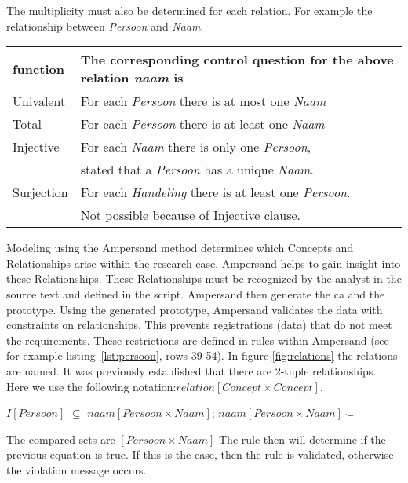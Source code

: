 The multiplicity must also be determined for each relation.
For example the relationship between \textit{Persoon} and \textit{Naam}.
\begin{table}[h!]
    \begin{tabular}{||l | l||} 
     \hline
    function & The corresponding control question for the above relation \textit{naam} is\\
    \hline\hline
        Univalent & For each \textit{Persoon} there is at most one \textit{Naam}\\ %
        Total & For each \textit{Persoon} there is at least one \textit{Naam} \\ %
        Injective & For each \textit{Naam} there is only one \textit{Persoon}, \\&stated that a \textit{Persoon} has a unique \textit{Naam}.\\ %
        Surjection & For each \textit{Handeling} there is at least one \textit{Persoon}. \\&Not possible because of Injective clause.\\ %
    \end{tabular}
    \label{tab:multiplicity}
\end{table}

Modeling using the Ampersand method determines which Concepts and Relationships arise within the research case.
Ampersand helps to gain insight into these Relationships.
These Relationships must be recognized by the analyst in the source text and defined in the script.
Ampersand then  generate the \acrshort{ca}  and the prototype.
Using the generated prototype, Ampersand validates the data with constraints on relationships.
This prevents registrations (data) that do not meet the requirements.
These restrictions are defined in rules within Ampersand (see for example listing~\ref{lst:persoon}, rows 39-54).
In figure \ref{fig:relations} the relations are named.
It was previously established that there are 2-tuple relationships.
Here we use the following notation:$\mathit{relation [Concept \times Concept]}$.
\begin{center}
$\mathit{I [Persoon]}$
\newline $\subseteq$
\newline  $\mathit{naam [Persoon \times Naam]}$;
 $\mathit{naam [Persoon \times Naam]~\smallsmile}$
\end{center}
The compared sets are
\newline $\mathit{[Persoon \times Naam]}$
\newline The rule then will determine if the previous equation is true.
\newline If this is the case, then the rule is validated, otherwise the violation message occurs.


